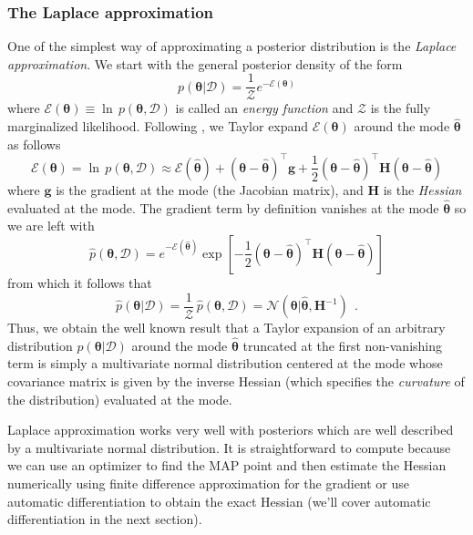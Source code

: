 \documentclass[12pt,dvipsnames]{report}
\renewcommand{\vec}[1]{\boldsymbol{\mathbf{#1}}}
\newcommand{\hquad}{~~}
\begin{document}
\subsubsection{The Laplace approximation}
One of the simplest way of approximating a posterior distribution is the
\textsl{Laplace approximation}. We start with the general posterior density of
the form
\begin{equation}
    p(\vec{\theta}\lvert\mathcal{D})=\frac{1}{\mathcal{Z}}e^{-\mathcal{E}(\vec{\theta})}
\end{equation}
where $\mathcal{E}(\vec{\theta}) \equiv \ln\,p(\vec{\theta}, \mathcal{D})$
is called an \textsl{energy function} and $\mathcal{Z}$ is the fully marginalized
likelihood. Following \citet{murphy_book_2022}, we Taylor expand $\mathcal{E}(\vec{\theta})$ around the mode
$\hat{\vec{\theta}}$ as follows
\begin{equation}
    \mathcal{E}(\vec{\theta}) =\ln\,p(\vec{\theta}, \mathcal{D})\approx \mathcal{E}(\hat{\vec{\theta}})+(\vec{\theta}-\hat{\vec{\theta}})^{\intercal} \vec{g}+\frac{1}{2}(\vec{\theta}-\hat{\vec{\theta}})^{\intercal} \mathbf{H}(\vec{\theta}-\hat{\vec{\theta}})
\end{equation}
where $\vec{g}$ is the gradient at the mode (the Jacobian matrix), and $\vec{H}$
is the \textsl{Hessian} evaluated at the mode. The gradient term by definition
vanishes at the mode $\hat{\vec{\theta}}$ so we are left with
\begin{equation}
    \hat{p}(\vec{\theta}, \mathcal{D})=e^{-\mathcal{E}(\hat{\vec{\theta}})} \exp \left[-\frac{1}{2}(\boldsymbol{\theta}-\hat{\vec{\theta}})^{\intercal} \mathbf{H}(\vec{\theta}-\hat{\vec{\theta}})\right]
\end{equation}
from which it follows that
\begin{equation}
    \hat{p}(\vec{\theta} \lvert\mathcal{D})=\frac{1}{\mathcal{Z}}\, \hat{p}(\vec{\theta}, \mathcal{D})=\mathcal{N}\left(\vec{\theta} \lvert\hat{\vec{\theta}}, \mathbf{H}^{-1}\right)\hquad .
\end{equation}
Thus, we obtain the well known result that a Taylor expansion of an arbitrary
distribution  $p(\vec{\theta} \lvert\mathcal{D})$ around the mode $\hat{\vec{\theta}}$
truncated at the first non-vanishing term is simply a multivariate normal distribution
centered at the mode whose covariance matrix is given by the inverse Hessian (which specifies
the \emph{curvature} of the distribution) evaluated at the mode.

Laplace approximation works very well with posteriors which are well described
by a multivariate normal distribution. It is straightforward to compute because
we can use an optimizer to find the MAP point and then estimate the Hessian
numerically using finite difference approximation for the gradient or use
automatic differentiation to obtain the exact Hessian (we'll cover automatic
differentiation in the next section).
\end{document}
